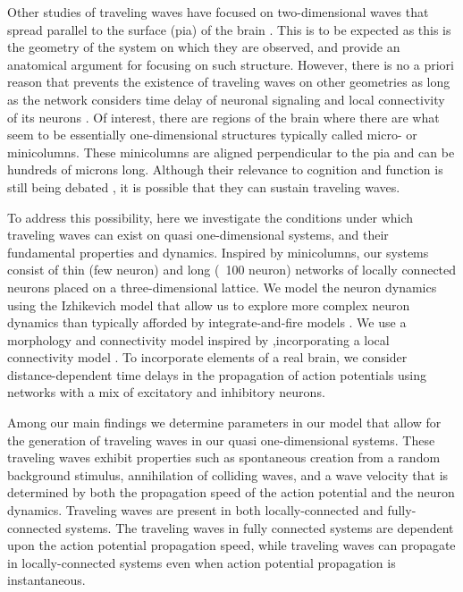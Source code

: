 \documentclass[12pt]{article}
\begin{document}
\color{red}Other \color{black} studies of traveling waves have focused on two-dimensional waves that spread parallel to the surface (pia) of the brain \parencite{reimer2010}\parencite{keane2015}\color{red}\cite{Townsend2018}\parencite{Golomb1997}\color{black}. 
This is to be expected as this is the geometry of the system on which they are observed, and \color{red}\parencite{Wilson1973} provide an anatomical argument for focusing on such structure\color{black}. 
However, there is no a priori reason that prevents the existence of traveling waves on other geometries as long as the network considers time delay of neuronal signaling and local connectivity of its neurons \parencite{ermentrout2001}\parencite{Senk2020}. 
Of interest, there are regions of the brain where there are what seem to be essentially one-dimensional structures \parencite{buxhoeveden2002}\parencite{mountcastle1997} typically called micro- or minicolumns. 
These minicolumns are aligned perpendicular to the pia and can be hundreds of microns long.  
Although their relevance to cognition and function is still being debated \parencite{horton2005}\parencite{Cruz2009}\parencite{DaCosta2010}\parencite{buxhoeveden2002}, it is possible that they can sustain traveling waves.

To address this possibility, here we investigate the conditions under which traveling waves can exist on quasi one-dimensional systems, and their fundamental properties and dynamics.  
Inspired by minicolumns, our systems consist of thin (few neuron) and long (~100 neuron) networks of locally connected neurons placed on a three-dimensional lattice.  
We model the neuron dynamics using the Izhikevich model \parencite{izhikevich2003} that allow us to explore more complex neuron dynamics than typically afforded by integrate-and-fire models \parencite{keane2015}\parencite{Senk2020}.
\color{red}We use a morphology and connectivity model inspired by \parencite{maass2002},incorporating a local connectivity model \parencite{Levy2012}\parencite{Pyle2017}\parencite{Fino2011}\color{black}.
To incorporate elements of a real brain, we consider distance-dependent time delays in the propagation of action potentials using networks with a mix of excitatory and inhibitory neurons.

Among our main findings we determine parameters in our model that allow for the generation of traveling waves in our quasi one-dimensional systems. 
These traveling waves exhibit properties such as spontaneous creation from a random background stimulus, annihilation of colliding waves, and a wave velocity that is determined by both the propagation speed of the action potential and the neuron dynamics.
Traveling waves are present in both locally-connected and fully-connected systems. 
The traveling waves in fully connected systems are dependent upon the action potential propagation speed, while traveling waves can propagate in locally-connected systems even when action potential propagation is instantaneous.
\end{document}
